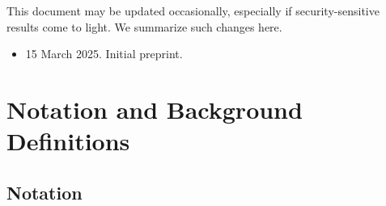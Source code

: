 \documentclass[11pt]{article}
\theoremstyle{definition}
\newcommand{\bitstrings}{\left\{0,1\right\}^*}
\newcommand{\rng}{F_{\texttt{PRNG}}}
\newcommand{\msg}{\texttt{msg}}
\newcommand{\sample}{\overset{\$}{\leftarrow}}
\begin{document}
This document may be updated occasionally, especially if security-sensitive results come to light. We summarize such changes here.
\begin{itemize}
\item 15 March 2025. Initial preprint.
\end{itemize}

\section{Notation and Background Definitions}

\subsection{Notation}



\end{document}
